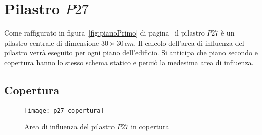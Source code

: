 \section{Pilastro $P27$}\label{sec:p27}

Come raffigurato in figura~\ref{fig:pianoPrimo} di pagina~\pageref{fig:pianoPrimo} il pilastro $P27$ è un pilastro centrale di dimensione $30\times 30\,cm$. Il calcolo dell'area di influenza del pilastro verrà eseguito per ogni piano dell'edificio. Si anticipa che piano secondo e copertura hanno lo stesso schema statico e perciò la medesima area di influenza.

\subsection{Copertura}

\begin{figure}
	\centering
	\texttt{[image: p27\_copertura]}
	\caption{Area di influenza del pilastro $P27$ in copertura}
\end{figure}

